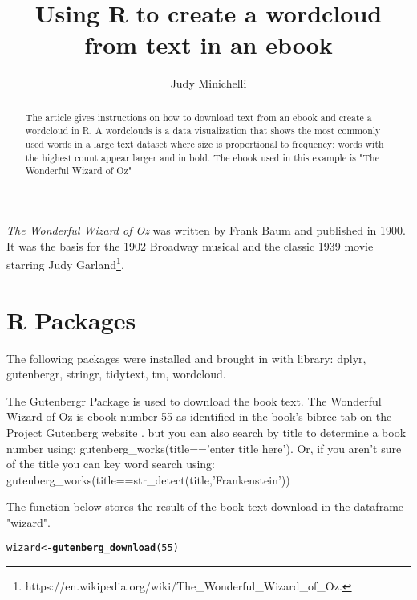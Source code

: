 \documentclass{article}\usepackage[]{graphicx}\usepackage[]{color}
\makeatletter
\newcommand{\hlnum}[1]{\textcolor[rgb]{0.686,0.059,0.569}{#1}}%
\newcommand{\hlstd}[1]{\textcolor[rgb]{0.345,0.345,0.345}{#1}}%
\newcommand{\hlkwb}[1]{\textcolor[rgb]{0.69,0.353,0.396}{#1}}%
\newcommand{\hlkwd}[1]{\textcolor[rgb]{0.737,0.353,0.396}{\textbf{#1}}}%
\newenvironment{kframe}{%
 \def\at@end@of@kframe{}%
 \ifinner\ifhmode%
  \def\at@end@of@kframe{\end{minipage}}%
  \begin{minipage}{\columnwidth}%
 \fi\fi%
 \def\FrameCommand##1{\hskip\@totalleftmargin \hskip-\fboxsep
 \colorbox{shadecolor}{##1}\hskip-\fboxsep
     \hskip-\linewidth \hskip-\@totalleftmargin \hskip\columnwidth}%
 \MakeFramed {\advance\hsize-\width
   \@totalleftmargin\z@ \linewidth\hsize
   \@setminipage}}%
 {\par\unskip\endMakeFramed%
 \at@end@of@kframe}
\newenvironment{knitrout}{}{} %
\makeatother
\begin{document}
\title{Using R to create a wordcloud from text in an ebook}
\author{Judy Minichelli}
\maketitle

\begin{abstract}
The article gives instructions on how to download text from an ebook and create a 
wordcloud in R.  A wordclouds is a data visualization that shows the most commonly used words in a large text dataset where size is proportional to frequency; words with the highest count appear larger and in bold.  The ebook used in this example
is "The Wonderful Wizard of Oz"

\end{abstract}

\textit{The Wonderful Wizard of Oz} was written by Frank Baum and published in 1900. It was the basis for the 1902 Broadway musical and the classic 1939 movie starring Judy Garland\footnote{https://en.wikipedia.org/wiki/The_Wonderful_Wizard_of_Oz.}. 

\section{R Packages}

The following packages were installed and brought in with library: dplyr, gutenbergr, stringr, tidytext, tm, wordcloud.

The Gutenbergr Package is used to download the book text.  The Wonderful Wizard of Oz is ebook number 55 as identified in the book's bibrec tab on the Project Gutenberg website \citep{Gutenberg.org}. but you can also search by title to determine a book number using: gutenberg_works(title=='enter title here').  Or, if you aren't sure of the title you can key word search using:  gutenberg_works(title==str_detect(title,'Frankenstein'))    

The function below stores the result of the book text download in the dataframe "wizard". 

\begin{knitrout}
\color{fgcolor}\begin{kframe}
\begin{alltt}
\hlstd{wizard}\hlkwb{<-}\hlkwd{gutenberg_download}\hlstd{(}\hlnum{55}\hlstd{)}
\end{alltt}


{\ttfamily\noindent\bfseries{}}\end{kframe}
\end{knitrout}
\end{document}
